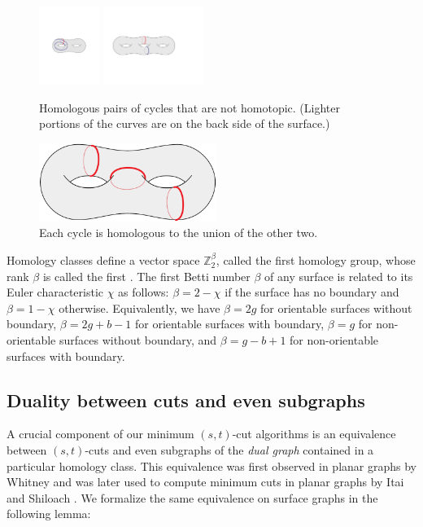 \documentclass[letterpaper,review]{siamart190516}
\def\Z{\mathbb{Z}}
\begin{document}
\begin{figure}[htb]
\centering
\includegraphics[height=1in]{Fig/homologous3}\qquad
\includegraphics[height=1in]{Fig/homologous2}
\caption{Homologous pairs of cycles that are not homotopic.  (Lighter portions of the curves are on the back side of the surface.)}
\label{fig:homology}
\end{figure}

\begin{figure}[htb]
\centering
\includegraphics[height=1in]{Fig/homologous1}
\caption{Each cycle is homologous to the union of the other two.}
\label{fig:homology2}
\end{figure}

Homology classes define a vector space $\Z_2^\beta$, called the first homology group, whose rank $\beta$ is called the first .  The first Betti number $\beta$ of any surface is related to its Euler characteristic $\chi$ as follows: $\beta = 2-\chi$ if the surface has no boundary and $\beta = 1-\chi$ otherwise.  Equivalently, we have $\beta = 2g$ for orientable surfaces without boundary, $\beta = 2g+b-1$ for orientable surfaces with boundary, $\beta = g$ for non-orientable surfaces without boundary, and $\beta = g-b+1$ for non-orientable surfaces with boundary.


\subsection{Duality between cuts and even subgraphs}
\label{SS:duality}


A crucial component of our minimum $(s,t)$-cut algorithms is an equivalence between $(s,t)$-cuts and even subgraphs of the \emph{dual graph} contained in a particular homology class.  This equivalence was first observed in planar graphs by Whitney \cite{w-pg-33} and was later used to compute minimum cuts in planar graphs by Itai and Shiloach \cite{is-mfpn-79}.
We formalize the same equivalence on surface graphs in the following lemma:
\end{document}
